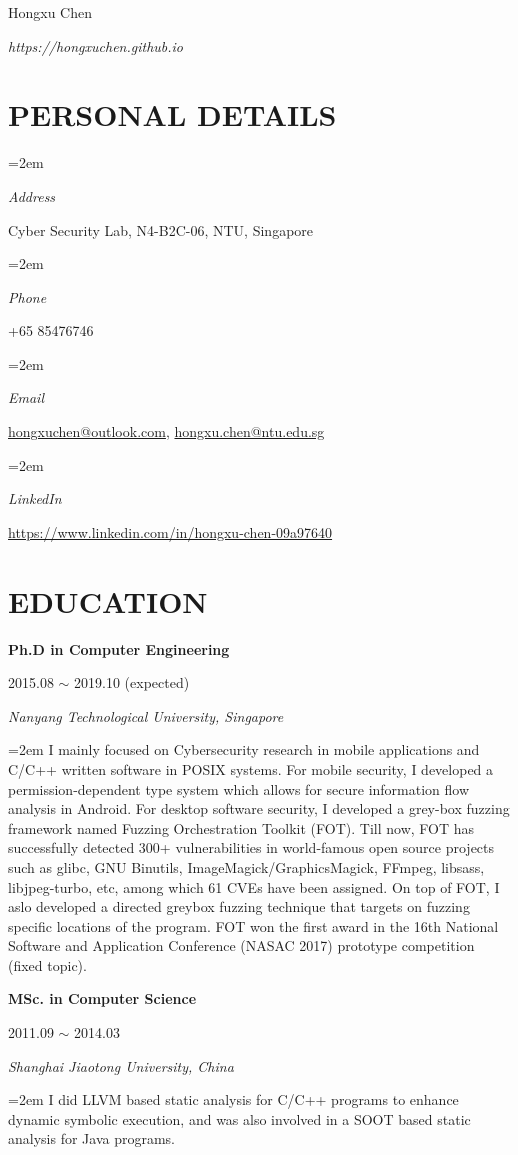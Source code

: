\documentclass[paper=a4,fontsize=11pt]{article} %
\newlength{\spacebox}
\newcommand{\sepspace}{\vspace*{9pt}}		%
\newcommand{\MyName}[2]{ %
		\Huge \usefont{OT1}{phv}{b}{n} \hfill #1 #2
		\par \normalsize \normalfont}
\newcommand{\MySlogan}[1]{ %
		\large \usefont{OT1}{phv}{m}{n}\hfill \textit{#1}
		\par \normalsize \normalfont}
\newcommand{\NewPart}[1]{\section*{\uppercase{#1}}}
\newcommand{\PersonalEntry}[2]{
		\noindent\hangindent=2em\hangafter=0 %
		\parbox{\spacebox}{        %
		\textit{#1}}		       %
		\hspace{1.5em} #2 \par}    %
\newcommand{\EducationEntry}[4]{
		\noindent \textbf{#1} \hfill      %
			\parbox{16em}{%
			\hfill\color{Black}#2} \par  %
		\noindent \textit{#3} \par        %
        \noindent\hangindent=2em\hangafter=0\small #4 %
		\normalsize \par}
\begin{document}
\nocite{*}


\MyName{Hongxu Chen}{}
\MySlogan{{https://hongxuchen.github.io}}


\sepspace

\NewPart{Personal details}{}

\PersonalEntry{Address}{Cyber Security Lab, N4-B2C-06, NTU, Singapore}
\PersonalEntry{Phone}{+65 85476746}
\PersonalEntry{Email}{\url{hongxuchen@outlook.com}, \url{hongxu.chen@ntu.edu.sg}}
\PersonalEntry{LinkedIn}{\url{https://www.linkedin.com/in/hongxu-chen-09a97640}}

\NewPart{Education}{}

\EducationEntry{Ph.D in Computer Engineering}{2015.08 $\sim$ 2019.10 (expected)}{Nanyang Technological University, Singapore}{
    I mainly focused on Cybersecurity research in mobile applications and C/C++ written software in POSIX systems. For mobile security, I developed a permission-dependent type system which allows for secure information flow analysis in Android. For desktop software security, I developed a grey-box fuzzing framework named Fuzzing Orchestration Toolkit (FOT). Till now, FOT has successfully detected 300+ vulnerabilities in world-famous open source projects such as glibc, GNU Binutils, ImageMagick/GraphicsMagick, FFmpeg, libsass, libjpeg-turbo, etc, among which 61 CVEs have been assigned. On top of FOT, I aslo developed a directed greybox fuzzing technique that targets on fuzzing specific locations of the program. FOT won the first award in the 16th National Software and Application Conference (NASAC 2017) prototype competition (fixed topic).
}
\sepspace

\EducationEntry{MSc. in Computer Science}{2011.09 $\sim$ 2014.03}{Shanghai Jiaotong University, China}{
  I did LLVM based static analysis for C/C++ programs to enhance dynamic symbolic execution, and was also involved in a SOOT based static analysis for Java programs.}
\sepspace
\end{document}
